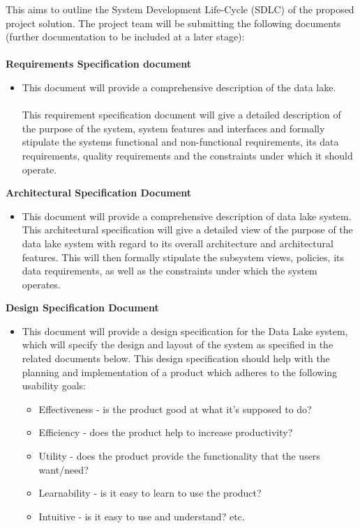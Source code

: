 This aims to outline the System Development Life-Cycle (SDLC) of the
proposed project solution.
The project team will be submitting the following documents (further documentation to be included at a later stage):
\newline \\ \\
\textbf{Requirements Specification document}
    \begin{itemize}
         \item This document will provide a comprehensive description of the data lake.\\ \\ This requirement specification document will give a detailed description of the purpose of the system, system features and interfaces and formally stipulate the systems functional and non-functional requirements, its data requirements, quality requirements and the constraints under which it should operate.
    \end{itemize}

\newline
\textbf{Architectural Specification Document}

    \begin{itemize}
         \item This document will provide a comprehensive description of data lake system. This architectural specification will give a detailed view of the purpose of the data lake system with regard to its overall architecture and architectural features. This will then formally stipulate the subsystem views, policies, its data requirements, as well as the constraints under which the system operates.
    \end{itemize}
    
\newline

\textbf{Design Specification Document}
    \begin{itemize}
         \item This document will provide a design specification for the Data Lake system, which will
specify the design and layout of the system as specified in the related documents below. This design specification should help with the planning and implementation of a product which adheres to the following usability goals:
\newline
\begin{itemize}
        \item  Effectiveness - is the product good at what it’s supposed to do?
        \item  Efficiency - does the product help to increase productivity?
        \item  Utility - does the product provide the functionality that the users
        want/need?
        \item  Learnability - is it easy to learn to use the product?
        \item  Intuitive - is it easy to use and understand? etc.
\end{itemize}
     \end{itemize}
     
